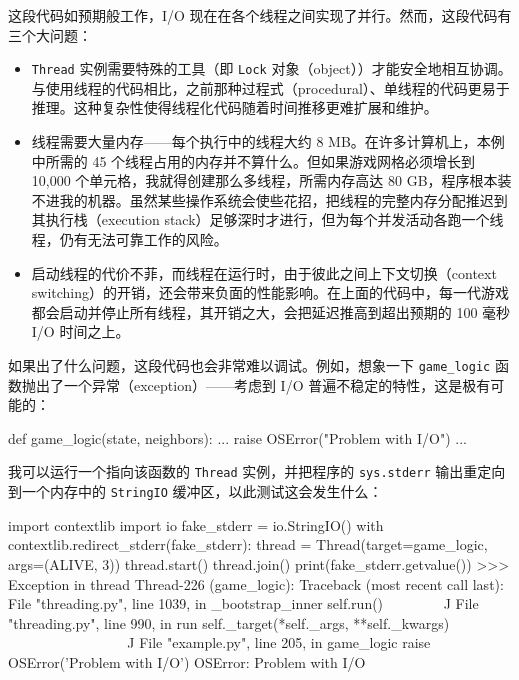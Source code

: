 这段代码如预期般工作，I/O 现在在各个线程之间实现了并行。然而，这段代码有三个大问题：

\begin{itemize}
\item \texttt{Thread} 实例需要特殊的工具（即 \texttt{Lock} 对象（object））才能安全地相互协调。与使用线程的代码相比，之前那种过程式（procedural）、单线程的代码更易于推理。这种复杂性使得线程化代码随着时间推移更难扩展和维护。
\item 线程需要大量内存——每个执行中的线程大约 8 MB。在许多计算机上，本例中所需的 45 个线程占用的内存并不算什么。但如果游戏网格必须增长到 10,000 个单元格，我就得创建那么多线程，所需内存高达 80 GB，程序根本装不进我的机器。虽然某些操作系统会使些花招，把线程的完整内存分配推迟到其执行栈（execution stack）足够深时才进行，但为每个并发活动各跑一个线程，仍有无法可靠工作的风险。
\item 启动线程的代价不菲，而线程在运行时，由于彼此之间上下文切换（context switching）的开销，还会带来负面的性能影响。在上面的代码中，每一代游戏都会启动并停止所有线程，其开销之大，会把延迟推高到超出预期的 100 毫秒 I/O 时间之上。
\end{itemize}

如果出了什么问题，这段代码也会非常难以调试。例如，想象一下 \texttt{game\_logic} 函数抛出了一个异常（exception）——考虑到 I/O 普遍不稳定的特性，这是极有可能的：

\begin{codebox}[python]
def game_logic(state, neighbors):
    ...
    raise OSError("Problem with I/O")
    ...
\end{codebox}

我可以运行一个指向该函数的 \texttt{Thread} 实例，并把程序的 \texttt{sys.stderr} 输出重定向到一个内存中的 \texttt{StringIO} 缓冲区，以此测试这会发生什么：

\begin{codebox}[python]
import contextlib
import io
fake_stderr = io.StringIO()
with contextlib.redirect_stderr(fake_stderr):
    thread = Thread(target=game_logic, args=(ALIVE, 3))
    thread.start()
    thread.join()
print(fake_stderr.getvalue())
>>>
Exception in thread Thread-226 (game_logic):
Traceback (most recent call last):
  File "threading.py", line 1039, in _bootstrap_inner
    self.run()
    ~~~~~~~~^^
  File "threading.py", line 990, in run
    self._target(*self._args, **self._kwargs)
    ~~~~~~~~~~~~^^^^^^^^^^^^^^^^^^^^^^^^^^^^^
  File "example.py", line 205, in game_logic
    raise OSError('Problem with I/O')
OSError: Problem with I/O
\end{codebox}

